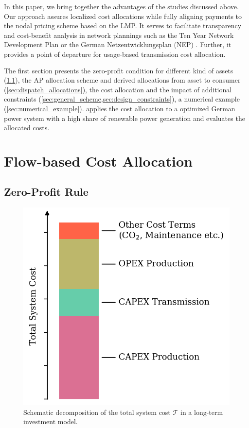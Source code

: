 \documentclass[11pt,twocolumn]{article}
\newcommand{\totalcost}{\mathcal{T}}
\begin{document}
In this paper, we bring together the advantages of the studies discussed above. Our approach assures localized cost allocations while fully aligning payments to the nodal pricing scheme based on the LMP. It serves to facilitate transparency and cost-benefit analysis in network plannings such as the Ten Year Network Development Plan \cite{entso-e_completing_2020} or the German Netzentwicklungsplan (NEP) \cite{bundesnetzagentur_netzentwicklungsplan_2020}. Further, it provides a point of departure for usage-based transmission cost allocation.

The first section presents the zero-profit condition for different kind of assets (\cref{sec:zero_profit_rule}),  the AP allocation scheme and derived allocations from asset to consumer (\cref{sec:dispatch_allocations}), the cost allocation and the impact of additional constraints (\cref{sec:general_scheme,sec:design_constraints}), a numerical example (\cref{sec:numerical_example}).  applies the cost allocation to a optimized German power system with a high share of renewable power generation and evaluates the allocated costs.  


\section{Flow-based Cost Allocation}

\subsection{Zero-Profit Rule}
\label{sec:zero_profit_rule}

\begin{figure}[h]
    \centering
    \includegraphics[width=.8\linewidth]{cost_decomposition.png}
    \caption{Schematic decomposition of the total system cost $\totalcost$ in a long-term investment model.}
    \label{fig:cost_decomposition}
\end{figure}
    
\end{document}
